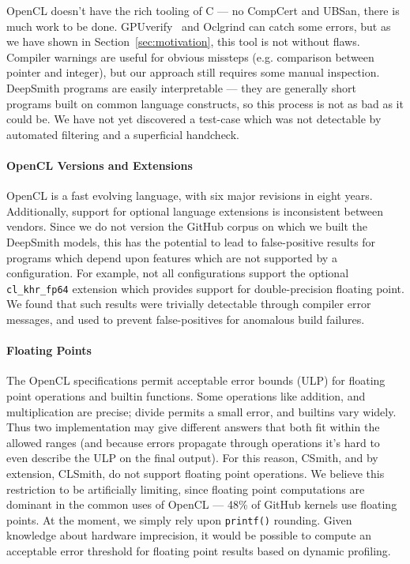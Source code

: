 OpenCL doesn't have the rich tooling of C --- no CompCert and UBSan, there is much work to be done. GPUverify~\cite{Betts2012} and Oclgrind can catch some errors, but as we have shown in Section~\ref{sec:motivation}, this tool is not without flaws. Compiler warnings are useful for obvious missteps (e.g. comparison between pointer and integer), but our approach still requires some manual inspection. DeepSmith programs are easily interpretable --- they are generally short programs built on common language constructs, so this process is not as bad as it could be. We have not yet discovered a test-case which was not detectable by automated filtering and a superficial handcheck.

\paragraph{OpenCL Versions and Extensions} OpenCL is a fast evolving language, with six major revisions in eight years. Additionally, support for optional language extensions is inconsistent between vendors. Since we do not version the GitHub corpus on which we built the DeepSmith models, this has the potential to lead to false-positive results for programs which depend upon features which are not supported by a configuration. For example, not all configurations support the optional \texttt{cl\_khr\_fp64} extension which provides support for double-precision floating point. We found that such results were trivially detectable through compiler error messages, and used to prevent false-positives for anomalous build failures.

\paragraph{Floating Points} The OpenCL specifications permit acceptable error bounds (ULP) for floating point operations and builtin functions. Some operations like addition, and multiplication are precise; divide permits a small error, and builtins vary widely. Thus two implementation may give different answers that both fit within the allowed ranges (and because errors propagate through operations it's hard to even describe the ULP on the final output). For this reason, CSmith, and by extension, CLSmith, do not support floating point operations. We believe this restriction to be artificially limiting, since floating point computations are dominant in the common uses of OpenCL --- %
48\% of GitHub kernels use floating points. At the moment, we simply rely upon \texttt{printf()} rounding. Given knowledge about hardware imprecision, it would be possible to compute an acceptable error threshold for floating point results based on dynamic profiling.

